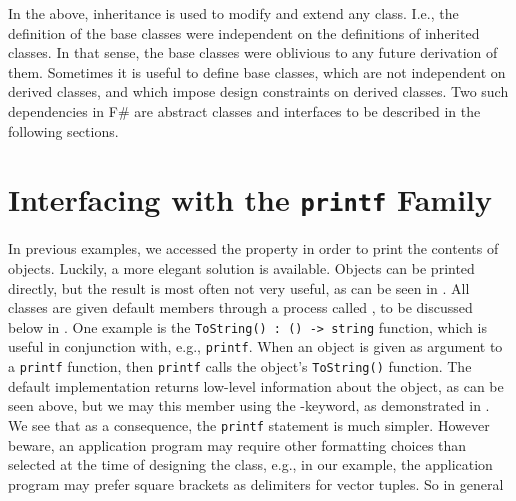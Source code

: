 In the above, inheritance is used to modify and extend any class. I.e., the definition of the base classes were independent on the definitions of inherited classes. In that sense, the base classes were oblivious to any future derivation of them. Sometimes it is useful to define base classes, which are not independent on derived classes, and which impose design constraints on derived classes. Two such dependencies in F\# are abstract classes and interfaces to be described in the following sections.

\section{Interfacing with the \lstinline{printf} Family}
In previous examples, we accessed the property in order to print the contents of objects. Luckily, a more elegant solution is available. Objects can be printed directly, but the result is most often not very useful, as can be seen in .
%
%
All classes are given default members through a process called , to be discussed below in . One example is the \lstinline{ToString() : () -> string} function, which is useful in conjunction with, e.g., \lstinline{printf}. When an object is given as argument to a \lstinline{printf} function, then \lstinline{printf} calls the object's \lstinline{ToString()} function. The default implementation returns low-level information about the object, as can be seen above, but we may 
 this member using the -keyword, as demonstrated in .
%
%
We see that as a consequence, the \lstinline{printf} statement is much simpler. However beware, an application program may require other formatting choices than selected at the time of designing the class, e.g., in our example, the application program may prefer square brackets as delimiters for vector tuples.  So in general  


